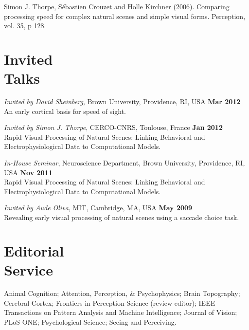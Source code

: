 \documentclass[margin,line]{resume}
\begin{document}
\begin{resume}
\vspace{-2mm} Simon J. Thorpe, Sébastien Crouzet and Holle Kirchner (2006). Comparing processing speed for complex natural scenes and simple visual forms. Perception, vol. 35, p 128.

\normalsize


\newpage

    \section{\mysidestyle Invited\\Talks}
    
\footnotesize %

\textit{Invited by David Sheinberg}, Brown University, Providence, RI, USA \hfill \textbf{Mar 2012}\\
An early cortical basis for speed of sight. 

\vspace{-2mm} 
\textit{Invited by Simon J. Thorpe}, CERCO-CNRS, Toulouse, France \hfill \textbf{Jan 2012}\\
Rapid Visual Processing of Natural Scenes: Linking Behavioral and Electrophysiological Data to Computational Models.

\vspace{-2mm} 
\textit{In-House Seminar}, Neuroscience Department, Brown University, Providence, RI, USA \hfill \textbf{Nov 2011}\\
Rapid Visual Processing of Natural Scenes: Linking Behavioral and Electrophysiological Data to Computational Models.

\vspace{-2mm} 
\textit{Invited by Aude Oliva}, MIT, Cambridge, MA, USA \hfill \textbf{May 2009}\\
Revealing early visual processing of natural scenes using a saccade choice task.

\normalsize


	\vspace{3mm}
	\section{\mysidestyle Editorial\\Service}

Animal Cognition; 
Attention, Perception, \& Psychophysics; 
Brain Topography;  
Cerebral Cortex; 
Frontiers in Perception Science (review editor); 
IEEE Transactions on Pattern Analysis and Machine Intelligence;
Journal of Vision;
PLoS ONE; 
Psychological Science;
Seeing and Perceiving.


\end{resume}
\end{document}
